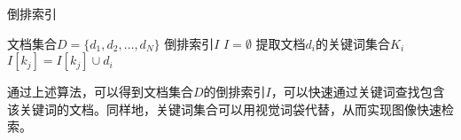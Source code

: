 \begin{algorithm}[H]
    \caption{倒排索引}
    \label{alg:inverted_index}
    \begin{algorithmic}[1] %
        \Require 文档集合$D=\{d_1,d_2,\dots,d_N\}$
        \Ensure 倒排索引$I$
        \State $I=\emptyset$
            \State 提取文档$d_i$的关键词集合$K_i$
                \State $I[k_j]=I[k_j]\cup d_i$
            \EndFor
        \EndFor
    \end{algorithmic}
\end{algorithm}

通过上述算法，可以得到文档集合$D$的倒排索引$I$，可以快速通过关键词查找包含该关键词的文档。同样地，关键词集合可以用视觉词袋代替，从而实现图像快速检索。